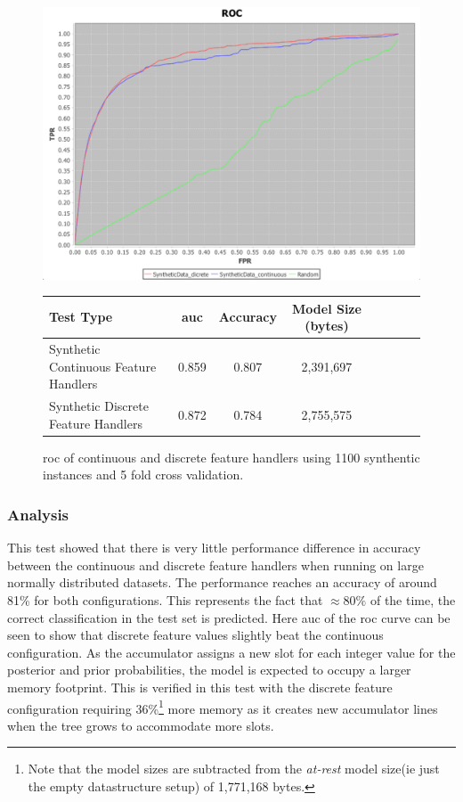 \documentclass[a4paper,11pt]{scrreprt}
\begin{document}
\begin{figure}[h!]
\centering
\caption{\acrshort{roc} of continuous and discrete feature handlers using 1100 synthentic instances and 5 fold cross validation.}
\includegraphics[scale=0.45, trim=0 -25 0 0, clip=true] {1000-instance-training-100-testing-synthetictest2.png}
\label{fig:syntheticresults2}
\begin{tabular}{l*{6}{c}r}
Test Type & \acrshort{auc} & Accuracy & Model Size (bytes)\\
\hline
Synthetic Continuous Feature Handlers & 0.859 & 0.807 & 2,391,697\\
Synthetic Discrete Feature Handlers & 0.872 & 0.784 & 2,755,575\\

\end{tabular}
\end{figure}

\subsubsection{Analysis}
This test showed that there is very little performance difference in accuracy between the continuous and discrete feature handlers when running on large normally distributed datasets. The performance reaches an accuracy of around 81\% for both configurations. This represents the fact that \(\approx80\%\) of the time, the correct classification in the test set is predicted. Here \acrshort{auc} of the \acrshort{roc} curve can be seen to show that discrete feature values slightly beat the continuous configuration. As the accumulator assigns a new slot for each integer value for the posterior and prior probabilities, the model is expected to occupy a larger memory footprint. This is verified in this test with the discrete feature configuration requiring 36\%\footnote{Note that the model sizes are subtracted from the \textit{at-rest} model size(ie just the empty datastructure setup) of 1,771,168 bytes.} more memory as it creates new accumulator lines when the tree grows to accommodate more slots.\\
\end{document}
